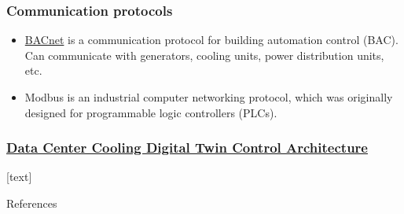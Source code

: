\documentclass[aspectratio=169,10pt,xcolor={table,dvipsnames},t]{beamer}
\begin{document}
{    \begin{frame}
        \frametitle{Communication protocols}
\begin{itemize}
	\item \href{https://datahub.berkeley.edu/user-redirect/git-pull?repo=https://github.com/mtsn-lab/me137-237a&subPath=examples/bacNetDataCenterCoolingDigitalTwinControlArchitectureipynb}{BACnet} is a communication protocol for building automation control (BAC). Can communicate with generators, cooling units, power distribution units, etc.
	\item Modbus is an industrial computer networking protocol, which was originally designed for programmable logic controllers (PLCs).
\end{itemize}
    \end{frame}

    \begin{frame}
        \frametitle{\href{https://datahub.berkeley.edu/user-redirect/git-pull?repo=https://github.com/mtsn-lab/me137-237a&subPath=examples/plcDataCenterCoolingDigitalTwinControlArchitecture.ipynb}{Data Center Cooling Digital Twin Control Architecture}}
    \end{frame}

    





{
[text] %
	\begin{frame}[allowframebreaks]{References}
		
		
	\end{frame}
}

}
\end{document}
